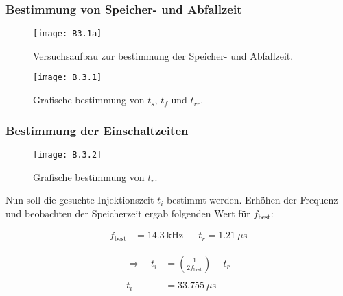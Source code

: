 \documentclass[
	a4paper, %
	12pt, %
]{CSUniSchoolLabReport}
\newcommand{\micro}{\ensuremath{\mu}}
\begin{document}
\subsubsection{Bestimmung von Speicher- und Abfallzeit}

\begin{figure}[H] %
	\centering %
	\texttt{[image: B3.1a]} %
	\caption{Versuchsaufbau zur bestimmung der Speicher- und Abfallzeit.}
	\vspace{1em}
\end{figure}

\begin{figure}[H] %
	\centering %
	\texttt{[image: B.3.1]} %
	\caption{Grafische bestimmung von $t_s$, $t_f$ und $t_{rr}$.}
\end{figure}

\subsubsection{Bestimmung der Einschaltzeiten}
\begin{figure}[H] %
	\centering %
	\texttt{[image: B.3.2]} %
	\caption{Grafische bestimmung von $t_r$.}
	\vspace{1em}
\end{figure}

Nun soll die gesuchte Injektionszeit $t_i$ bestimmt werden. Erhöhen der Frequenz und beobachten der Speicherzeit ergab folgenden Wert für $f_{\text{best}}$: 

\begin{align*}
	f_{\text{best}} &= \SI{14,3}{\kilo\hertz} 
	&& t_r = \SI{1,21}{\micro\second}
\end{align*}

\begin{align*}
	\Rightarrow\quad 
    t_i &= \left(\frac{1}{2 f_{\text{best}}}\right) - t_r \\ \\
    t_i &= \SI{33,755}{\micro\second}
\end{align*}
\end{document}
